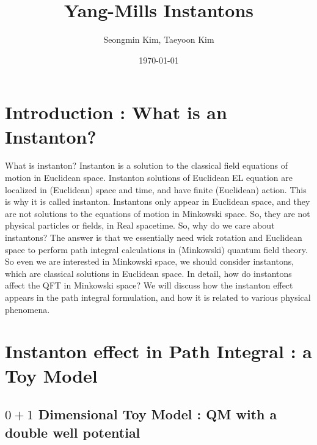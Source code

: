 \documentclass{article}
\title{Yang-Mills Instantons}
\author{Seongmin Kim, Taeyoon Kim}
\date{\today}
\begin{document}
\maketitle

\section{Introduction : What is an Instanton?}


What is instanton? Instanton is a solution to the classical field equations of motion in Euclidean space. Instanton solutions of Euclidean EL equation are localized in (Euclidean) space and time, and have finite (Euclidean) action. This is why it is called instanton.
Instantons only appear in Euclidean space, and they are not solutions to the equations of motion in Minkowski space. So, they are not physical particles or fields, in Real spacetime. So, why do we care about instantons? 
The answer is that we essentially need wick rotation and Euclidean space to perform path integral calculations in (Minkowski) quantum field theory. 
So even we are interested in Minkowski space, we should consider instantons, which are classical solutions in Euclidean space.
In detail, how do instantons affect the QFT in Minkowski space? We will discuss how the instanton effect appears in the path integral formulation, and how it is related to various physical phenomena. 


\section{Instanton effect in Path Integral : a Toy Model}

\subsection{$0+1$ Dimensional Toy Model : QM with a double well potential}
\end{document}
